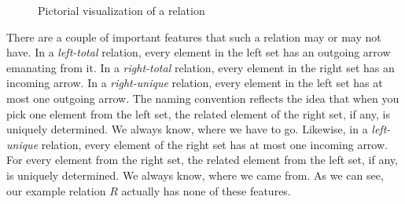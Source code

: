 \begin{figure}[h]
\label{Fig:RelationLessThan_123_024}
\caption{Pictorial visualization of a relation}
\centering
	
\end{figure}
There are a couple of important features that such a relation may or may not have. In a \emph{left-total} relation, every element in the left set has an outgoing arrow emanating from it. In a \emph{right-total} relation, every element in the right set has an incoming arrow. In a \emph{right-unique} relation, every element in the left set has at most one outgoing arrow. The naming convention reflects the idea that when you pick one element from the left set, the related  element of the right set, if any, is uniquely determined. We always know, where we have to go. Likewise, in a \emph{left-unique} relation, every element of the right set has at most one incoming arrow. For every element from the right set, the related element from the left set, if any, is uniquely determined. We always know, where we came from. As we can see, our example relation $R$ actually has none of these features.

